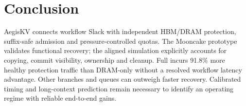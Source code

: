\section{Conclusion}
AegisKV connects workflow Slack with independent HBM/DRAM protection,
suffix-safe admission and pressure-controlled quotas. The Mooncake prototype
validates functional recovery; the aligned simulation explicitly accounts for
copying, commit visibility, ownership and cleanup. Full incurs 91.8\%
more healthy protection traffic than DRAM-only without a resolved workflow
latency advantage. Other branches and queues can outweigh faster recovery.
Calibrated timing and long-context prediction remain necessary to identify
an operating regime with reliable end-to-end gains.
